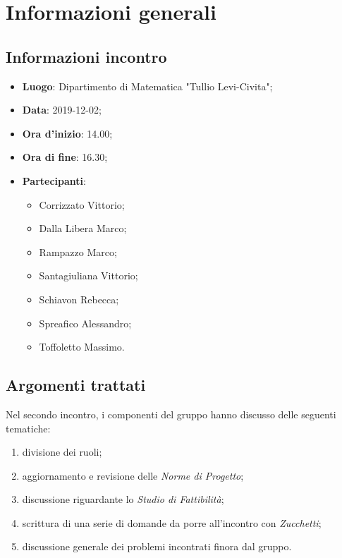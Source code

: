 \section{Informazioni generali}
    \subsection{Informazioni incontro}
        \begin{itemize}
            \item \textbf{Luogo}: Dipartimento di Matematica "Tullio Levi-Civita";
            \item \textbf{Data}: 2019-12-02;
            \item \textbf{Ora d'inizio}: 14.00;
            \item \textbf{Ora di fine}: 16.30;
            \item \textbf{Partecipanti}: \begin{itemize}
                \item Corrizzato Vittorio;
                \item Dalla Libera Marco;
                \item Rampazzo Marco;
                \item Santagiuliana Vittorio;
                \item Schiavon Rebecca;
                \item Spreafico Alessandro;
                \item Toffoletto Massimo.
            \end{itemize}
        \end{itemize}
    \subsection{Argomenti trattati}
        Nel secondo incontro, i componenti del gruppo hanno discusso delle seguenti tematiche:
        \begin{enumerate}
            \item divisione dei ruoli;
            \item aggiornamento e revisione delle \textit{Norme di Progetto};
            \item discussione riguardante lo \textit{Studio di Fattibilità};
            \item scrittura di una serie di domande da porre all'incontro con \textit{Zucchetti};
            \item discussione generale dei problemi incontrati finora dal gruppo.
        \end{enumerate}
